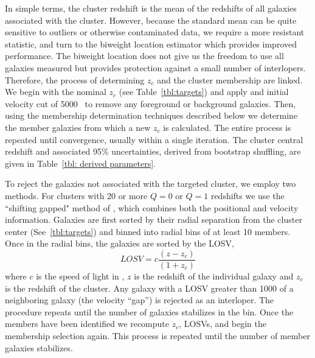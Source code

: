 In simple terms, the cluster redshift is the mean of the redshifts of all galaxies associated with the cluster. However, because the standard mean can be quite sensitive to outliers or otherwise contaminated data, we require a more resistant statistic, and turn to the biweight location estimator \citep{Beers1990} which provides improved performance. The biweight location does not give us the freedom to use all galaxies measured but provides protection against a small number of interlopers. Therefore, the process of determining $z_c$ and the cluster membership are linked. We begin with the nominal $z_c$ (see Table~\ref{tbl:targets}) and apply and initial velocity cut of 5000 \kms\ to remove any foreground or background galaxies. Then, using the membership determination techniques described below we determine the member galaxies from which a new $z_c$ is calculated. The entire process is repeated until convergence, usually within a single iteration. The cluster central redshift and associated 95\% uncertainties, derived from bootstrap shuffling, are given in Table~\ref{tbl: derived parameters}.

To reject the galaxies not associated with the targeted cluster, we employ two methods. For clusters with 20 or more $Q=0$ or $Q=1$ redshifts we use the ``shifting gapped" method of \cite{Fadda1996}, which combines both the positional and velocity information. Galaxies are first sorted by their radial separation from the cluster center (See~\ref{tbl:targets}) and binned into radial bins of at least 10 members. Once in the radial bins, the galaxies are sorted by the LOSV, 
\begin{equation}
	LOSV = c\frac{(z-z_{c})}{(1+z_{c})} 
\end{equation}
where $c$ is the speed of light in \kms, $z$ is the redshift of the individual galaxy and $z_{c}$ is the redshift of the cluster. Any galaxy with a LOSV greater than 1000 \kms of a neighboring galaxy (the velocity ``gap'') is rejected as an interloper. The procedure repeats until the number of galaxies stabilizes in the bin. Once the members have been identified we recompute $z_c$, LOSVs, and begin the membership selection again. This process is repeated until the number of member galaxies stabilizes. 


